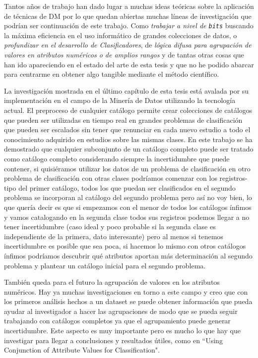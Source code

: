 
Tantos años de trabajo han dado lugar a muchas ideas teóricas sobre la aplicación de técnicas de DM por lo que quedan abiertas muchas líneas de investigación que podrían ser continuación de este trabajo. Como \emph{trabajar a nivel de \texttt{bits}} buscando la máxima eficiencia en el uso informático de grandes colecciones de datos, o \emph{profundizar en el desarrollo de Clasificadores}, de \emph{lógica difusa para agrupación de valores en atributos numéricos o de amplios rangos} y de tantas otras cosas que han ido apareciendo en el estado del arte de esta tesis y que no he podido abarcar para centrarme en obtener algo tangible mediante el método científico.

La investigación mostrada en el último capítulo de esta tesis está avalada por su implementación en el campo de la Minería de Datos utilizando la tecnología actual.
El preproceso de cualquier catálogo permite crear colecciones de catálogos que pueden ser utilizadas en tiempo real en grandes problemas de clasificación que pueden ser escalados sin tener que renunciar en cada nuevo estudio a todo el conocimiento adquirido en estudios sobre las mismas clases. En este trabajo se ha demostrado que cualquier subconjunto de un catálogo completo puede ser tratado como catálogo completo considerando siempre la incertidumbre que puede contener, si quisiéramos utilizar los datos de un problema de clasificación en otro problema de clasificación con otras clases podríamos comenzar con los registros-tipo del primer catálogo, todos los que puedan ser clasificados en el segundo problema se incorporan al catálogo del segundo problema pero así no  voy bien, lo que quería decir es que si empezamos con el menor de todos los catálogos ínfimos y vamos catalogando en la segunda clase todos sus registros podemos llegar a no tener incertidumbre (caso ideal y poco probable si la segunda clase es independiente de la primera, dato interesante) pero al menos si tenemos incertidumbre es posible que sea poca, si hacemos lo mismo con otros catálogos ínfimos podríamos descubrir qué atributos aportan más determinación al segundo problema y plantear un catálogo inicial para el segundo problema.

También queda para el futuro la agrupación de valores en los atributos numéricos. Hay ya muchas investigaciones en torno a este campo y creo que con los primeros análisis hechos a un dataset se puede obtener información que pueda ayudar al investigador a hacer las agrupaciones de modo que se pueda seguir trabajando con catálogos completos ya que el agrupamiento puede generar incertidumbre. Este aspecto es muy importante pero es mucho lo que hay que investigar para llegar a conclusiones y resultados útiles, como en ``Using Conjunction of Attribute Values for Classification".